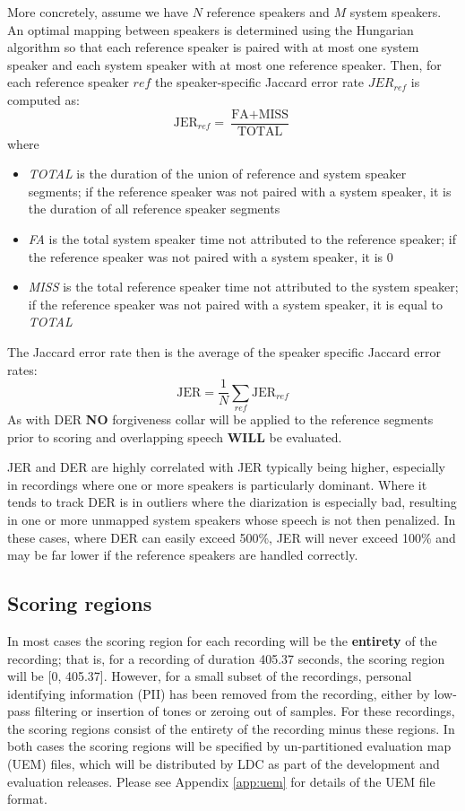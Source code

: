 \documentclass{article}
\begin{document}
More concretely, assume we have $N$ reference speakers and $M$ system speakers. An optimal mapping between speakers is determined using the Hungarian algorithm so that each reference speaker is paired with at most one system speaker and each system speaker with at most one reference speaker. Then, for each reference speaker $ref$ the speaker-specific Jaccard error rate $JER_{ref}$ is computed as:
    \begin{equation*}
        \textrm{JER}_{ref} = \frac{\textrm{FA} + \textrm{MISS}}{\textrm{TOTAL}}
    \end{equation*}
where
\begin{itemize}
    \item {\it TOTAL} is the duration of the union of reference and system speaker segments; if the reference speaker was not paired with a system speaker, it is the duration of all reference speaker segments
    \item {\it FA} is the total system speaker time not attributed to the reference speaker; if the reference speaker was not paired with a system speaker, it is 0
    \item {\it MISS} is the total reference speaker time not attributed to the system speaker; if the reference speaker was not paired with a system speaker, it is equal to {\it TOTAL}
\end{itemize}
The Jaccard error rate then is the average of the speaker specific Jaccard error rates:
    \begin{equation*}
        \textrm{JER} = \frac{1}{N}\sum_{ref}\textrm{JER}_{ref}
    \end{equation*}
As with DER {\bf NO} forgiveness collar will be applied to the reference segments prior to scoring and overlapping speech {\bf WILL} be evaluated.

JER and DER are highly correlated with JER typically being higher, especially in recordings where one or more speakers is particularly dominant. Where it tends to track DER is in outliers where the diarization is especially bad, resulting in one or more unmapped system speakers whose speech is not then penalized. In these cases, where DER can easily exceed 500\%, JER will never exceed 100\% and may be far lower if the reference speakers are handled correctly. 


\subsection{Scoring regions}
In most cases the scoring region for each recording will be the {\bf entirety} of the recording; that is, for a recording of duration 405.37 seconds, the scoring region will be [0, 405.37]. However, for a small subset of the recordings, personal identifying information (PII) has been removed from the recording, either by low-pass filtering or insertion of tones or zeroing out of samples. For these recordings, the scoring regions consist of the entirety of the recording minus these regions. In both cases the scoring regions will be specified by un-partitioned evaluation map (UEM) files, which will be distributed by LDC as part of the development and evaluation releases. Please see Appendix \ref{app:uem} for details of the UEM file format.
\end{document}
